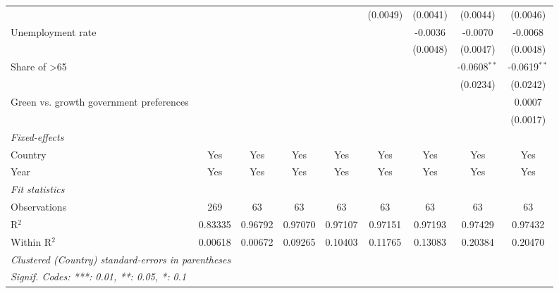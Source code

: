 \begin{table}[htbp]
\begin{tabular}{lcccccccc}
                                                                         &          &          &              &              & (0.0049)     & (0.0041) & (0.0044)       & (0.0046)\\   
      Unemployment rate                                                  &          &          &              &              &              & -0.0036  & -0.0070        & -0.0068\\   
                                                                         &          &          &              &              &              & (0.0048) & (0.0047)       & (0.0048)\\   
      Share of >65                                                       &          &          &              &              &              &          & -0.0608$^{**}$ & -0.0619$^{**}$\\   
                                                                         &          &          &              &              &              &          & (0.0234)       & (0.0242)\\   
      Green vs. growth government preferences                            &          &          &              &              &              &          &                & 0.0007\\   
                                                                         &          &          &              &              &              &          &                & (0.0017)\\   
      \midrule
      \emph{Fixed-effects}\\
      Country                                                            & Yes      & Yes      & Yes          & Yes          & Yes          & Yes      & Yes            & Yes\\  
      Year                                                               & Yes      & Yes      & Yes          & Yes          & Yes          & Yes      & Yes            & Yes\\  
      \midrule
      \emph{Fit statistics}\\
      Observations                                                       & 269      & 63       & 63           & 63           & 63           & 63       & 63             & 63\\  
      R$^2$                                                              & 0.83335  & 0.96792  & 0.97070      & 0.97107      & 0.97151      & 0.97193  & 0.97429        & 0.97432\\  
      Within R$^2$                                                       & 0.00618  & 0.00672  & 0.09265      & 0.10403      & 0.11765      & 0.13083  & 0.20384        & 0.20470\\  
      \midrule \midrule
      \multicolumn{9}{l}{\emph{Clustered (Country) standard-errors in parentheses}}\\
      \multicolumn{9}{l}{\emph{Signif. Codes: ***: 0.01, **: 0.05, *: 0.1}}\\
   \end{tabular}
\end{table}


